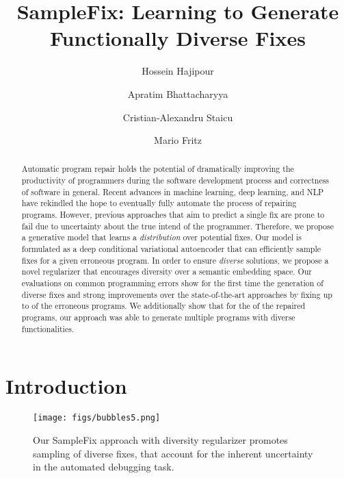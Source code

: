 \documentclass[runningheads]{llncs}
\begin{document}
\title{SampleFix: Learning to Generate Functionally Diverse Fixes}
\author{Hossein Hajipour\and
Apratim Bhattacharyya\and Cristian-Alexandru Staicu\and 
Mario Fritz}
\maketitle              \begin{abstract}
Automatic program repair holds the potential of dramatically improving the productivity of programmers during the software development process and correctness of software in general. Recent advances in machine learning, deep learning, and NLP have rekindled the hope to eventually fully automate the process of repairing programs. 
  However, previous approaches that aim to predict a single fix are prone to fail due to uncertainty about the true intend of the programmer. Therefore, we propose a generative model that learns a \textit{distribution} over potential fixes. Our model is formulated as a deep conditional variational autoencoder that can efficiently sample fixes for a given erroneous program. In order to ensure \textit{diverse} solutions, we propose a novel regularizer that encourages diversity over a semantic embedding space. Our evaluations on common programming errors show for the first time the generation of diverse fixes and strong improvements over the state-of-the-art approaches by fixing up to  of the erroneous programs. We additionally show that for the  of the repaired programs, our approach was able to generate multiple programs with diverse functionalities.  
\end{abstract}
\section{Introduction}


\begin{wrapfigure}[14]{R}{0.4\linewidth}
\vspace{-1.35cm}
\centering
    \texttt{[image: figs/bubbles5.png]}
    \caption{Our SampleFix approach with diversity regularizer promotes sampling of diverse fixes, that account for the inherent uncertainty in the automated debugging task.}
\label{fig:bubbles}
\end{wrapfigure}
\end{document}
